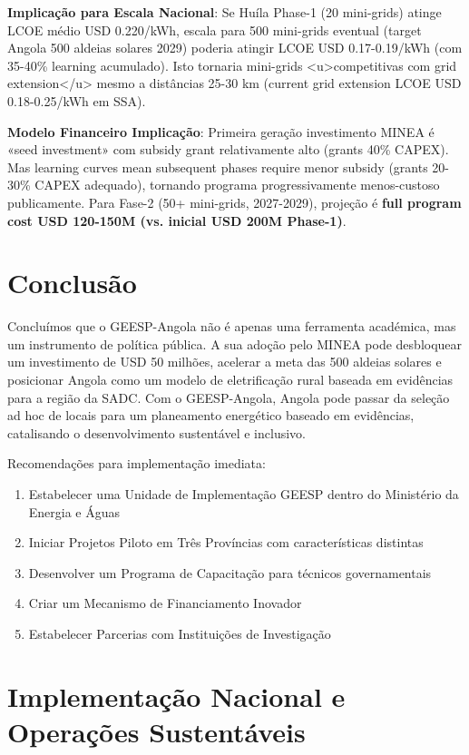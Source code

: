 \documentclass[12pt, a4paper]{article}
\begin{document}
\textbf{Implicação para Escala Nacional}: Se Huíla Phase-1 (20 mini-grids) atinge LCOE médio USD 0.220/kWh, escala para 500 mini-grids eventual (target Angola 500 aldeias solares 2029) poderia atingir LCOE USD 0.17-0.19/kWh (com 35-40\% learning acumulado). Isto tornaria mini-grids <u>competitivas com grid extension</u> mesmo a distâncias 25-30 km (current grid extension LCOE USD 0.18-0.25/kWh em SSA).


\textbf{Modelo Financeiro Implicação}: Primeira geração investimento MINEA é «seed investment» com subsidy grant relativamente alto (grants 40\% CAPEX). Mas learning curves mean subsequent phases require menor subsidy (grants 20-30\% CAPEX adequado), tornando programa progressivamente menos-custoso publicamente. Para Fase-2 (50+ mini-grids, 2027-2029), projeção é 
\textbf{full program cost USD 120-150M (vs. inicial USD 200M Phase-1)}.

\section{Conclusão}

Concluímos que o GEESP-Angola não é apenas uma ferramenta académica, mas um instrumento de política pública. A sua adoção pelo MINEA pode desbloquear um investimento de USD 50 milhões, acelerar a meta das 500 aldeias solares e posicionar Angola como um modelo de eletrificação rural baseada em evidências para a região da SADC. Com o GEESP-Angola, Angola pode passar da seleção ad hoc de locais para um planeamento energético baseado em evidências, catalisando o desenvolvimento sustentável e inclusivo.

Recomendações para implementação imediata:
\begin{enumerate}
\item Estabelecer uma Unidade de Implementação GEESP dentro do Ministério da Energia e Águas
\item Iniciar Projetos Piloto em Três Províncias com características distintas
\item Desenvolver um Programa de Capacitação para técnicos governamentais
\item Criar um Mecanismo de Financiamento Inovador
\item Estabelecer Parcerias com Instituições de Investigação
\end{enumerate}

\clearpage
\section{Implementação Nacional e Operações Sustentáveis}
\end{document}
